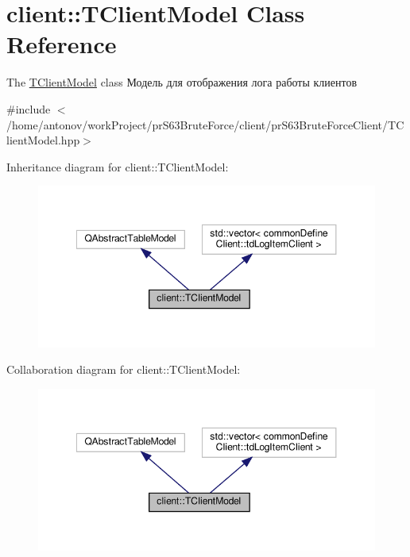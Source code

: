 \hypertarget{classclient_1_1_t_client_model}{}\section{client\+:\+:T\+Client\+Model Class Reference}
\label{classclient_1_1_t_client_model}


The \hyperlink{classclient_1_1_t_client_model}{T\+Client\+Model} class Модель для отображения лога работы клиентов  




{\ttfamily \#include $<$/home/antonov/work\+Project/pr\+S63\+Brute\+Force/client/pr\+S63\+Brute\+Force\+Client/\+T\+Client\+Model.\+hpp$>$}



Inheritance diagram for client\+:\+:T\+Client\+Model\+:\nopagebreak
\begin{figure}[H]
\begin{center}
\leavevmode
\includegraphics[width=348pt]{classclient_1_1_t_client_model__inherit__graph}
\end{center}
\end{figure}


Collaboration diagram for client\+:\+:T\+Client\+Model\+:\nopagebreak
\begin{figure}[H]
\begin{center}
\leavevmode
\includegraphics[width=348pt]{classclient_1_1_t_client_model__coll__graph}
\end{center}
\end{figure}
